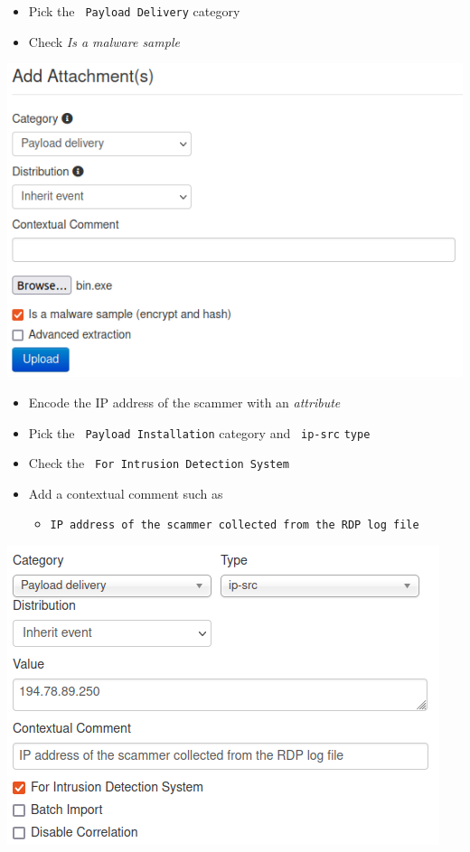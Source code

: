 \begin{frame}
    \begin{itemize}
        \item Pick the \texttt{\color{black} Payload Delivery} category
        \item Check \textit{\color{black} Is a malware sample}
    \end{itemize}
    \begin{center}
        \includegraphics[width=0.80\linewidth]{pictures/case1/attribute-bin.png}
    \end{center}
\end{frame}

\begin{frame}
    \begin{itemize}
        \item Encode the IP address of the scammer with an \textit{attribute}
        \item Pick the \texttt{\color{black} Payload Installation} category and \texttt{\color{black} ip-src}  \texttt{type}
        \item Check the \texttt{\color{black} For Intrusion Detection System}
        \item Add a contextual comment such as
        \begin{itemize}
            \item \texttt{IP address of the scammer collected from the RDP log file}
        \end{itemize}
    \end{itemize}
    \begin{center}
        \includegraphics[width=0.55\linewidth]{pictures/case1/attribute-ip.png}
    \end{center}
\end{frame}


